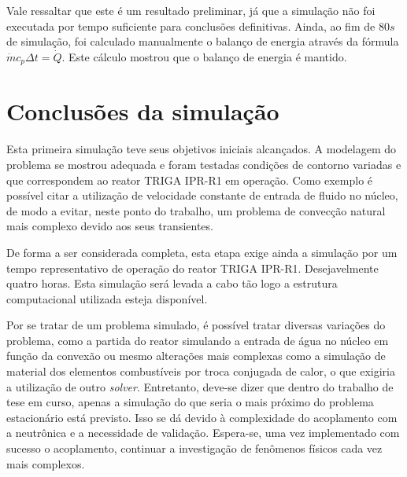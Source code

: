 \documentclass[12pt,openright,twoside,a4paper,english,french,spanish,brazil]{abntex2}
\begin{document}
Vale ressaltar que este é um resultado preliminar, já que a simulação não foi executada por 
tempo suficiente para conclusões definitivas. Ainda, ao fim de $80 s$ de simulação, foi calculado 
manualmente o balanço de energia através da fórmula $\dot m c_p \Delta t=\Dot Q$. Este cálculo 
mostrou que o balanço de energia é mantido.

\section{Conclusões da simulação}
\label{sec:csim}

Esta primeira simulação teve seus objetivos iniciais alcançados. A modelagem do problema se mostrou 
adequada e foram testadas condições de contorno variadas e que correspondem ao reator TRIGA IPR-R1 
em operação. Como exemplo é possível citar a utilização de velocidade constante de entrada de fluido 
no núcleo, de modo a evitar, neste ponto do trabalho, um problema de convecção natural mais complexo 
devido aos seus transientes.

De forma a ser considerada completa, esta etapa exige ainda a simulação por um tempo representativo 
de operação do reator TRIGA IPR-R1. Desejavelmente quatro horas. Esta simulação será levada a cabo 
tão logo a estrutura computacional utilizada esteja disponível.

Por se tratar de um problema simulado, é possível tratar diversas variações do problema, como a partida 
do reator simulando a entrada de água no núcleo em função da convexão ou mesmo alterações mais complexas 
como a simulação de material dos elementos combustíveis por troca conjugada de calor, o que exigiria 
a utilização de outro \textit{solver}. Entretanto, deve-se dizer que dentro do trabalho de tese em curso, 
apenas a simulação do que seria o mais próximo do problema estacionário está previsto. Isso se dá devido 
à complexidade do acoplamento com a neutrônica e a necessidade de validação. Espera-se, uma vez 
implementado com sucesso o acoplamento, continuar a investigação de fenômenos físicos cada vez mais 
complexos.
\end{document}
